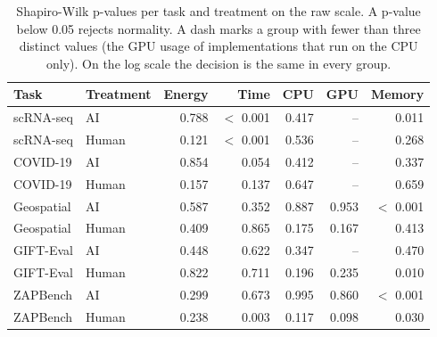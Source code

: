 \begin{table}[ht]
\centering
\caption{Shapiro-Wilk p-values per task and treatment on the raw scale. A p-value below 0.05 rejects normality. A dash marks a group with fewer than three distinct values (the GPU usage of implementations that run on the CPU only). On the log scale the decision is the same in every group.} 
\label{tab:03_shapiro_wilk}
\begingroup\small
\begin{tabular}{llrrrrr}
  \toprule
Task & Treatment & Energy & Time & CPU & GPU & Memory \\ 
  \midrule
scRNA-seq & AI & 0.788 & $<$ 0.001 & 0.417 & – & 0.011 \\ 
  scRNA-seq & Human & 0.121 & $<$ 0.001 & 0.536 & – & 0.268 \\ 
  COVID-19 & AI & 0.854 & 0.054 & 0.412 & – & 0.337 \\ 
  COVID-19 & Human & 0.157 & 0.137 & 0.647 & – & 0.659 \\ 
  Geospatial & AI & 0.587 & 0.352 & 0.887 & 0.953 & $<$ 0.001 \\ 
  Geospatial & Human & 0.409 & 0.865 & 0.175 & 0.167 & 0.413 \\ 
  GIFT-Eval & AI & 0.448 & 0.622 & 0.347 & – & 0.470 \\ 
  GIFT-Eval & Human & 0.822 & 0.711 & 0.196 & 0.235 & 0.010 \\ 
  ZAPBench & AI & 0.299 & 0.673 & 0.995 & 0.860 & $<$ 0.001 \\ 
  ZAPBench & Human & 0.238 & 0.003 & 0.117 & 0.098 & 0.030 \\ 
   \bottomrule
\end{tabular}
\endgroup
\end{table}
